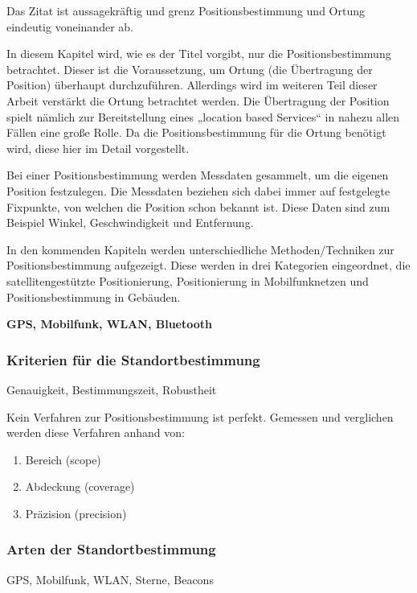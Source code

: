 Das Zitat ist aussagekräftig und grenz Positionsbestimmung und Ortung eindeutig voneinander ab.

In diesem Kapitel wird, wie es der Titel vorgibt, nur die Positionsbestimmung betrachtet. Dieser ist die Voraussetzung, um Ortung (die Übertragung der Position) überhaupt durchzuführen. Allerdings wird im weiteren Teil dieser Arbeit verstärkt die Ortung betrachtet werden. Die Übertragung der Position spielt nämlich zur Bereitstellung eines „location based Services“ in nahezu allen Fällen eine große Rolle. Da die Positionsbestimmung für die Ortung benötigt wird, diese hier im Detail vorgestellt.


Bei einer Positionsbestimmung werden Messdaten gesammelt, um die eigenen Position festzulegen. Die Messdaten beziehen sich dabei immer auf festgelegte Fixpunkte, von welchen die Position schon bekannt ist.  Diese Daten sind zum Beispiel Winkel, Geschwindigkeit und Entfernung.

In den kommenden Kapiteln werden unterschiedliche Methoden/Techniken zur Positionsbestimmung aufgezeigt. Diese werden in drei Kategorien eingeordnet, die satellitengestützte Positionierung, Positionierung in Mobilfunknetzen und Positionsbestimmung in Gebäuden.


\textbf{GPS, Mobilfunk, WLAN, Bluetooth}

\subsubsection{Kriterien für die Standortbestimmung}
Genauigkeit, Bestimmungszeit, Robustheit

Kein Verfahren zur Positionsbestimmung ist perfekt. Gemessen und verglichen werden diese Verfahren anhand von:

\begin{enumerate}
\item Bereich (scope)
\item Abdeckung (coverage)
\item Präzision (precision)
\end{enumerate}
\cite[S.183]{Schiller2004}

\subsubsection{Arten der Standortbestimmung}
GPS, Mobilfunk, WLAN, Sterne, Beacons